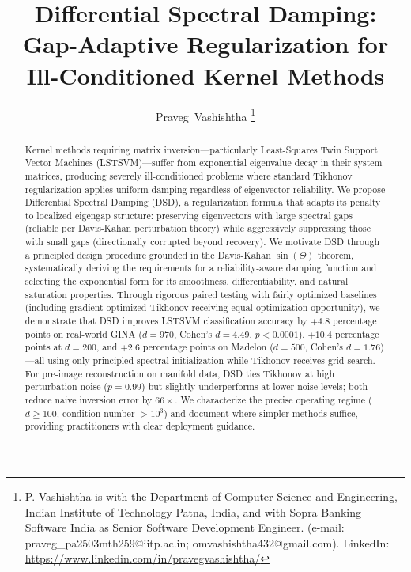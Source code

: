 \documentclass[journal]{IEEEtran}
\begin{document}
\title{Differential Spectral Damping: Gap-Adaptive Regularization for Ill-Conditioned Kernel Methods}

\author{Praveg~Vashishtha
\thanks{P. Vashishtha is with the Department of Computer Science and Engineering, Indian Institute of Technology Patna, India, and with Sopra Banking Software India as Senior Software Development Engineer. (e-mail: praveg\_pa2503mth259@iitp.ac.in; omvashishtha432@gmail.com). LinkedIn: \url{https://www.linkedin.com/in/pravegvashishtha/}}}

\maketitle

\begin{abstract}
Kernel methods requiring matrix inversion---particularly Least-Squares Twin Support Vector Machines (LSTSVM)---suffer from exponential eigenvalue decay in their system matrices, producing severely ill-conditioned problems where standard Tikhonov regularization applies uniform damping regardless of eigenvector reliability. We propose Differential Spectral Damping (DSD), a regularization formula that adapts its penalty to localized eigengap structure: preserving eigenvectors with large spectral gaps (reliable per Davis-Kahan perturbation theory) while aggressively suppressing those with small gaps (directionally corrupted beyond recovery). We motivate DSD through a principled design procedure grounded in the Davis-Kahan $\sin(\Theta)$ theorem, systematically deriving the requirements for a reliability-aware damping function and selecting the exponential form for its smoothness, differentiability, and natural saturation properties. Through rigorous paired testing with fairly optimized baselines (including gradient-optimized Tikhonov receiving equal optimization opportunity), we demonstrate that DSD improves LSTSVM classification accuracy by $+4.8$ percentage points on real-world GINA ($d{=}970$, Cohen's $d = 4.49$, $p < 0.0001$), $+10.4$ percentage points at $d{=}200$, and $+2.6$ percentage points on Madelon ($d{=}500$, Cohen's $d = 1.76$)---all using only principled spectral initialization while Tikhonov receives grid search. For pre-image reconstruction on manifold data, DSD ties Tikhonov at high perturbation noise ($p{=}0.99$) but slightly underperforms at lower noise levels; both reduce naive inversion error by $66\times$. We characterize the precise operating regime ($d \geq 100$, condition number $> 10^3$) and document where simpler methods suffice, providing practitioners with clear deployment guidance.
\end{abstract}
\end{document}
